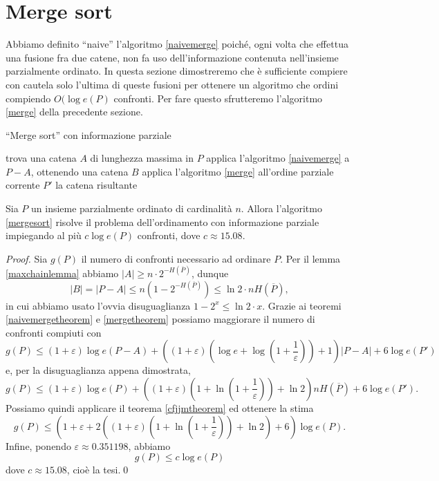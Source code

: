 \section{Merge sort} Abbiamo definito ``naive'' l'algoritmo \ref{naivemerge} poich\'e, ogni volta che effettua una fusione fra due catene, non fa uso dell'informazione contenuta nell'insieme parzialmente ordinato. In questa sezione dimostreremo che \`e sufficiente compiere con cautela solo l'ultima di queste fusioni per ottenere un algoritmo che ordini compiendo \(O(\log{e(P)}\) confronti. Per fare questo sfrutteremo l'algoritmo \ref{merge} della precedente sezione. 
\begin{algorithm}
	\caption{``Merge sort'' con informazione parziale} \label{mergesort} 
	\begin{algorithmic}
		[1] \STATE trova una catena \(A\) di lunghezza massima in \(P\) \STATE applica l'algoritmo \ref{naivemerge} a \(P-A\), ottenendo una catena \(B\) \STATE applica l'algoritmo \ref{merge} all'ordine parziale corrente \(P'\) \RETURN la catena risultante 
	\end{algorithmic}
\end{algorithm}
\begin{theorem}
	\label{mergesorttheorem} Sia \(P\) un insieme parzialmente ordinato di cardinalità \(n\). Allora l'algoritmo \ref{mergesort} risolve il problema dell'ordinamento con informazione parziale impiegando al più \(c \log{e(P)}\) confronti, dove \(c\approx 15.08\). 
\end{theorem}
\begin{proof}
	Sia \(g(P)\) il numero di confronti necessario ad ordinare \(P\). Per il lemma \ref{maxchainlemma} abbiamo \(|A|\ge n\cdot 2^{-H(\overline{P})}\), dunque
	\[|B|=|P-A|\le n\left(1-2^{-H(\overline{P})}\right)\le\ln{2}\cdot nH(\overline{P}),\]
	in cui abbiamo usato l'ovvia disuguaglianza \(1-2^{x}\le\ln{2}\cdot x\). Grazie ai teoremi \ref{naivemergetheorem} e \ref{mergetheorem} possiamo maggiorare il numero di confronti compiuti con
	\[g(P)\le(1+\varepsilon)\log{e(P-A)}+\left((1+\varepsilon)\left(\log{e}+\log{\left(1+\frac{1}{\varepsilon}\right)}\right)+1\right)|P-A|+6\log{e(P')}\]
	e, per la disuguaglianza appena dimostrata,
	\[ g(P)\le(1+\varepsilon)\log{e(P)}+\left((1+\varepsilon)\left(1+\ln{\left(1+\frac{1}{\varepsilon}\right)}\right)+\ln{2}\right)nH(\overline{P})+6\log{e(P')}.\]
	Possiamo quindi applicare il teorema \ref{cfjjmtheorem} ed ottenere la stima
	\[g(P)\le\left(1+\varepsilon+2\left((1+\varepsilon)\left(1+\ln{\left(1+\frac{1}{\varepsilon}\right)}\right)+\ln{2}\right)+6\right)\log{e(P)}.\]
	Infine, ponendo \(\varepsilon\approx 0.351198\), abbiamo
	\[g(P)\le c\log{e(P)}\nonumber\]
	dove \(c\approx 15.08\), cioè la tesi.\qed 
\end{proof}
